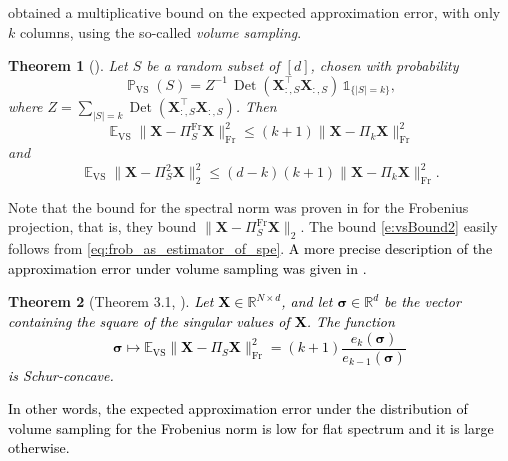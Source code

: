 \documentclass[twoside,11pt]{book}
\newcommand{\rev}[1]{\textcolor{black}{#1}}
\newtheorem{theorem}{Theorem}
\numberwithin{theorem}{chapter}
\numberwithin{definition}{chapter}
\numberwithin{proposition}{chapter}
\numberwithin{corollary}{chapter}
\numberwithin{example}{chapter}
\numberwithin{lemma}{chapter}
\numberwithin{assumption}{chapter}
\numberwithin{equation}{chapter}
\numberwithin{figure}{chapter}
\DeclareMathOperator{\Det}{Det}
\DeclareMathOperator{\Fr}{\mathrm{Fr}}
\DeclareMathOperator{\VS}{\mathrm{VS}}
\DeclareMathOperator{\Tran}{\intercal}
\DeclareMathOperator{\EX}{\mathbb{E}}
\DeclareMathOperator{\Prb}{\mathbb{P}}
\begin{document}
 \citet*{DRVW06} obtained a multiplicative bound on the expected approximation error, with only $k$ columns, using the so-called \emph{volume sampling}.
\begin{theorem}[\citealp{DRVW06}]
  \label{thrm:volume_sampling_theorem}
Let $S$ be a random subset of $[d]$, chosen with probability
\begin{equation}
\Prb_{\VS}(S) = Z^{-1} \,\Det(\bm{X}_{:,S}^{\Tran}\bm{X}_{:,S}^{})\, \mathbb{1}_{\{|S| = k \}},
\label{e:vs}
\end{equation}
where $Z = \sum\limits_{|S| = k} \Det(\bm{X}_{:,S}^{\Tran}\bm{X}_{:,S}^{})$.
Then
\begin{equation}
\EX_{\VS} \| \bm{X} - \Pi_{S}^{\Fr}\bm{X} \|_{\Fr}^{2} \leq (k+1)\| \bm{X} - \Pi_{k}\bm{X} \|_{\Fr}^{2}
\label{e:vsBoundFr}
\end{equation}
and
\begin{equation}
\EX_{\VS} \| \bm{X} - \Pi_{S}^{2}\bm{X} \|_{2}^{2} \leq (d-k)(k+1)\| \bm{X} - \Pi_{k}\bm{X} \|_{\Fr}^{2} .
\label{e:vsBound2}
\end{equation}
\end{theorem}
Note that the bound for the spectral norm was proven in \cite{DRVW06} for the Frobenius projection, that is, they bound $\| \bm{X} - \Pi_{S}^{\Fr}\bm{X} \|_{2}$. The bound \eqref{e:vsBound2} easily follows from \eqref{eq:frob_as_estimator_of_spe}. \rev{A more precise description of the approximation error under volume sampling was given in \cite{GuSi12}.}
\begin{theorem}[Theorem 3.1, \citealp{GuSi12}]\label{thm:schur_convex_volume_sampling}
\rev{Let $\bm{X} \in \mathbb{R}^{N \times d}$, and let $\bm{\sigma}\in \mathbb{R}^{d}$ be the vector containing the square of the singular values of $\bm{X}$. The function
\begin{equation}
\bm{\sigma} \mapsto \mathbb{E}_{\VS} \|\bm{X}- \Pi_{S} \bm{X}\|_{\Fr}^{2} = (k+1)\frac{e_{k}(\bm{\sigma})}{e_{k-1}(\bm{\sigma})}
\end{equation}
is Schur-concave.}
\end{theorem}
\rev{In other words, the expected approximation error under the distribution of volume sampling for the Frobenius norm is low for flat spectrum and it is large otherwise.}
\end{document}
